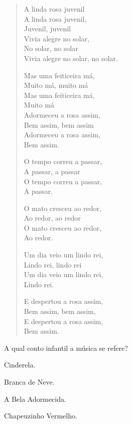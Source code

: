 \begin{verse}
A linda rosa juvenil\\
A linda rosa juvenil,\\
Juvenil, juvenil\\
Vivia alegre no solar,\\
No solar, no solar\\
Vivia alegre no solar, no solar.

Mas uma feiticeira má,\\
Muito má, muito má\\
Mas uma feiticeira má,\\
Muito má\\
Adormeceu a rosa assim,\\
Bem assim, bem assim\\
Adormeceu a rosa assim,\\
Bem assim.

O tempo correu a passar,\\
A passar, a passar\\
O tempo correu a passar,\\
A passar.

O mato cresceu ao redor,\\
Ao redor, ao redor\\
O mato cresceu ao redor,\\
Ao redor.

Um dia veio um lindo rei,\\
Lindo rei, lindo rei\\
Um dia veio um lindo rei,\\
Lindo rei.

E despertou a rosa assim,\\
Bem assim, bem assim,\\
E despertou a rosa assim,\\
Bem assim.
\end{verse}


A qual conto infantil a música se refere?

\begin{escolha}
\item Cinderela.

\item Branca de Neve.

\item A Bela Adormecida.

\item Chapeuzinho Vermelho.
\end{escolha}


